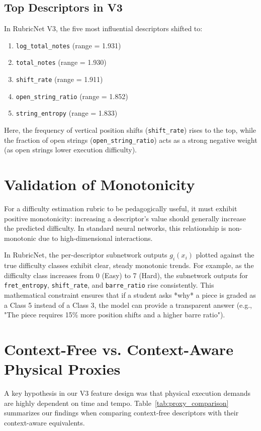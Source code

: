 \subsection{Top Descriptors in V3}
In RubricNet V3, the five most influential descriptors shifted to:
\begin{enumerate}
    \item \texttt{log\_total\_notes} (range = 1.931)
    \item \texttt{total\_notes} (range = 1.930)
    \item \texttt{shift\_rate} (range = 1.911)
    \item \texttt{open\_string\_ratio} (range = 1.852)
    \item \texttt{string\_entropy} (range = 1.833)
\end{enumerate}
Here, the frequency of vertical position shifts (\texttt{shift\_rate}) rises to the top, while the fraction of open strings (\texttt{open\_string\_ratio}) acts as a strong negative weight (as open strings lower execution difficulty).

\section{Validation of Monotonicity}
For a difficulty estimation rubric to be pedagogically useful, it must exhibit positive monotonicity: increasing a descriptor's value should generally increase the predicted difficulty. In standard neural networks, this relationship is non-monotonic due to high-dimensional interactions. 

In RubricNet, the per-descriptor subnetwork outputs $g_i(x_i)$ plotted against the true difficulty classes exhibit clear, steady monotonic trends. For example, as the difficulty class increases from 0 (Easy) to 7 (Hard), the subnetwork outputs for \texttt{fret\_entropy}, \texttt{shift\_rate}, and \texttt{barre\_ratio} rise consistently. This mathematical constraint ensures that if a student asks *why* a piece is graded as a Class 5 instead of a Class 3, the model can provide a transparent answer (e.g., "The piece requires 15\% more position shifts and a higher barre ratio").

\section{Context-Free vs. Context-Aware Physical Proxies}
A key hypothesis in our V3 feature design was that physical execution demands are highly dependent on time and tempo. Table~\ref{tab:proxy_comparison} summarizes our findings when comparing context-free descriptors with their context-aware equivalents.

